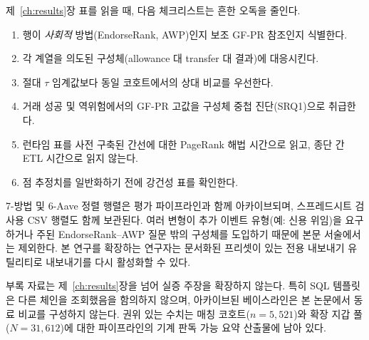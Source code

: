 
제~\ref{ch:results}장 표를 읽을 때, 다음 체크리스트는 흔한 오독을 줄인다.

\begin{enumerate}
\item 행이 \emph{사회적} 방법(EndorseRank, AWP)인지 보조 GF-PR 참조인지 식별한다.
\item 각 계열을 의도된 구성체(allowance 대 transfer 대 결과)에 대응시킨다.
\item 절대 $\tau$ 임계값보다 동일 코호트에서의 상대 비교를 우선한다.
\item 거래 성공 및 역위험에서의 GF-PR 고값을 구성체 중첩 진단(SRQ1)으로 취급한다.
\item 런타임 표를 사전 구축된 간선에 대한 PageRank 해법 시간으로 읽고, 종단 간 ETL 시간으로 읽지 않는다.
\item 점 추정치를 일반화하기 전에 강건성 표를 확인한다.
\end{enumerate}


7-방법 및 6-Aave 정렬 행렬은 평가 파이프라인과 함께 아카이브되며, 스프레드시트 검사용 CSV 행렬도 함께 보관된다. 여러 변형이 추가 이벤트 유형(예: 신용 위임)을 요구하거나 주된 EndorseRank--AWP 질문 밖의 구성체를 도입하기 때문에 본문 서술에서는 제외한다. 본 연구를 확장하는 연구자는 문서화된 프리셋이 있는 전용 내보내기 유틸리티로 내보내기를 다시 활성화할 수 있다.


부록 자료는 제~\ref{ch:results}장을 넘어 실증 주장을 확장하지 않는다. 특히 SQL 템플릿은 다른 체인을 조회했음을 함의하지 않으며, 아카이브된 베이스라인은 본 논문에서 동료 비교를 구성하지 않는다. 권위 있는 수치는 매칭 코호트($n=5{,}521$)와 확장 지갑 풀($N=31{,}612$)에 대한 파이프라인의 기계 판독 가능 요약 산출물에 남아 있다.
